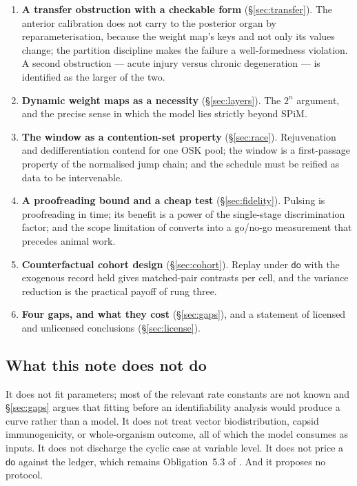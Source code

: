 \documentclass[11pt,a4paper]{article}
\theoremstyle{plain}
\theoremstyle{definition}
\theoremstyle{remark}
\newcommand{\dok}{\textsf{do}}
\begin{document}
\begin{enumerate}[leftmargin=1.4em,itemsep=3pt]
\item \textbf{A transfer obstruction with a checkable form}
(\S\ref{sec:transfer}). The anterior calibration does not carry to the
posterior organ by reparameterisation, because the weight map's keys and not
only its values change; the partition discipline makes the failure a
well-formedness violation. A second obstruction --- acute injury versus
chronic degeneration --- is identified as the larger of the two.
\item \textbf{Dynamic weight maps as a necessity} (\S\ref{sec:layers}). The
$2^n$ argument, and the precise sense in which the model lies strictly beyond
SPiM.
\item \textbf{The window as a contention-set property} (\S\ref{sec:race}).
Rejuvenation and dedifferentiation contend for one OSK pool; the window is a
first-passage property of the normalised jump chain; and the schedule must be
reified as data to be intervenable.
\item \textbf{A proofreading bound and a cheap test}
(\S\ref{sec:fidelity}). Pulsing is proofreading in time; its benefit is a
power of the single-stage discrimination factor; and the scope limitation of
\cite{Proofreading} converts into a go/no-go measurement that precedes animal
work.
\item \textbf{Counterfactual cohort design} (\S\ref{sec:cohort}). Replay under
$\dok$ with the exogenous record held gives matched-pair contrasts per cell,
and the variance reduction is the practical payoff of rung three.
\item \textbf{Four gaps, and what they cost} (\S\ref{sec:gaps}), and a
statement of licensed and unlicensed conclusions (\S\ref{sec:license}).
\end{enumerate}

\subsection{What this note does not do}

It does not fit parameters; most of the relevant rate constants are not known
and \S\ref{sec:gaps} argues that fitting before an identifiability analysis
would produce a curve rather than a model. It does not treat vector
biodistribution, capsid immunogenicity, or whole-organism outcome, all of
which the model consumes as inputs. It does not discharge the cyclic case at
variable level. It does not price a $\dok$ against the ledger, which remains
Obligation~5.3 of \cite{Interventions}. And it proposes no protocol.
\end{document}
